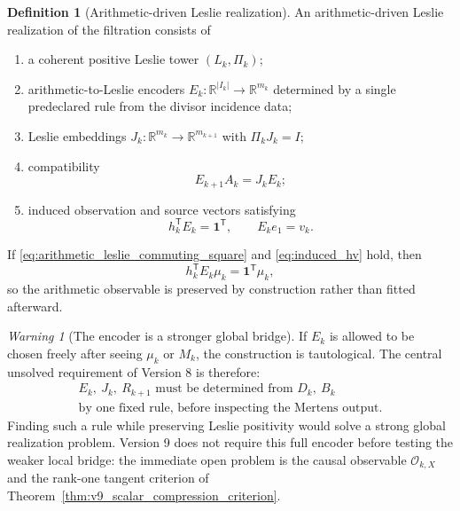 \documentclass[11pt]{amsart}
\numberwithin{equation}{section}
\theoremstyle{plain}
\theoremstyle{definition}
\newtheorem{definition}[theorem]{Definition}
\theoremstyle{remark}
\newtheorem{warning}[theorem]{Warning}
\begin{document}
\begin{definition}[Arithmetic-driven Leslie realization]
\label{def:arithmetic_driven_leslie}
An arithmetic-driven Leslie realization of the filtration consists of
\begin{enumerate}
\item a coherent positive Leslie tower $(L_k,\Pi_k)$;
\item arithmetic-to-Leslie encoders
$E_k:\mathbb R^{|I_k|}\to\mathbb R^{m_k}$ determined by a single
predeclared rule from the divisor incidence data;
\item Leslie embeddings $J_k:\mathbb R^{m_k}\to\mathbb R^{m_{k+1}}$
with $\Pi_kJ_k=I$;
\item compatibility
\begin{equation}
\boxed{E_{k+1}A_k=J_kE_k;}
\label{eq:arithmetic_leslie_commuting_square}
\end{equation}
\item induced observation and source vectors satisfying
\begin{equation}
h_k^{\mathsf T}E_k=\mathbf 1^{\mathsf T},
\qquad
E_ke_1=v_k.
\label{eq:induced_hv}
\end{equation}
\end{enumerate}
\end{definition}

If \eqref{eq:arithmetic_leslie_commuting_square} and
\eqref{eq:induced_hv} hold, then
\begin{equation}
h_k^{\mathsf T}E_k\mu_k
=
\mathbf 1^{\mathsf T}\mu_k,
\label{eq:observable_commutes}
\end{equation}
so the arithmetic observable is preserved by construction rather than fitted afterward.

\begin{warning}[The encoder is a stronger global bridge]
\label{warn:encoder_tautology}
If $E_k$ is allowed to be chosen freely after seeing $\mu_k$ or $M_k$, the construction is
tautological.  The central unsolved requirement of Version 8 is therefore:
\begin{equation}
\label{eq:canonical_bridge_requirement}
\begin{gathered}
E_k,\ J_k,\ R_{k+1}\text{ must be determined from }D_k,\ B_k\\
\text{by one fixed rule, before inspecting the Mertens output.}
\end{gathered}
\end{equation}
Finding such a rule while preserving Leslie positivity would solve a strong global realization
problem.  Version 9 does not require this full encoder before testing the weaker local bridge:
the immediate open problem is the causal observable $\mathcal O_{k,X}$ and the rank-one tangent
criterion of Theorem~\ref{thm:v9_scalar_compression_criterion}.
\end{warning}
\end{document}

